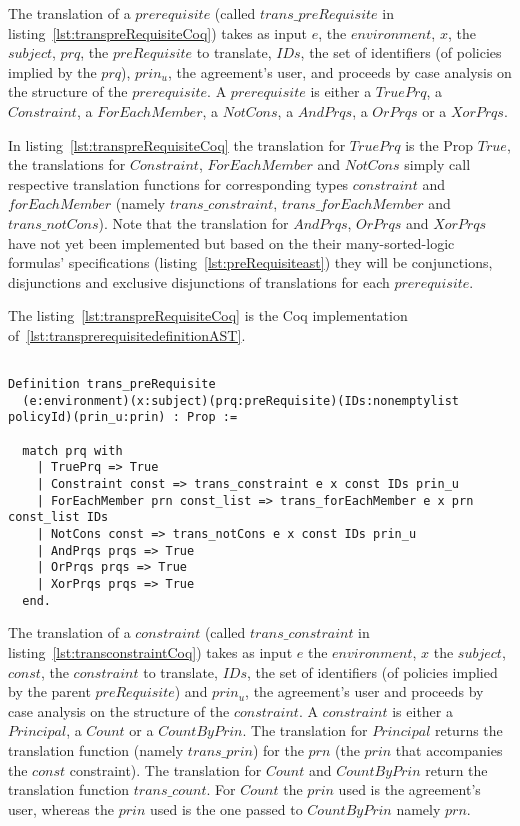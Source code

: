 The translation of a $prerequisite$ (called $trans\_preRequisite$ in listing~\ref{lst:transpreRequisiteCoq}) takes as input $e$, the $environment$, $x$, the $subject$, $prq$, the $preRequisite$ to translate, $IDs$, the set of identifiers (of policies implied by the $prq$), $prin_{u}$, the agreement's user, and proceeds by case analysis on the structure of the $prerequisite$. A $prerequisite$ is either a $TruePrq$, a $Constraint$, a $ForEachMember$, a $NotCons$, a $AndPrqs$, a $OrPrqs$ or a $XorPrqs$. 

In listing~\ref{lst:transpreRequisiteCoq} the translation for $TruePrq$ is the Prop $True$, the translations for $Constraint$, $ForEachMember$ and $NotCons$ simply call respective translation functions for corresponding types $constraint$ and $forEachMember$ (namely $trans\_constraint$, $trans\_forEachMember$ and $trans\_notCons$). Note that the translation for $AndPrqs$, $OrPrqs$ and $XorPrqs$ have not yet been implemented but based on the their many-sorted-logic formulas' specifications (listing~\ref{lst:preRequisiteast}) they will be conjunctions, disjunctions and exclusive disjunctions of translations for each $prerequisite$.

The listing~\ref{lst:transpreRequisiteCoq} is the Coq implementation of~\ref{lst:transprerequisitedefinitionAST}.


\begin{minipage}[c]{0.95\textwidth}
\begin{lstlisting}

Definition trans_preRequisite
  (e:environment)(x:subject)(prq:preRequisite)(IDs:nonemptylist policyId)(prin_u:prin) : Prop := 

  match prq with
    | TruePrq => True
    | Constraint const => trans_constraint e x const IDs prin_u 
    | ForEachMember prn const_list => trans_forEachMember e x prn const_list IDs 
    | NotCons const => trans_notCons e x const IDs prin_u 
    | AndPrqs prqs => True 
    | OrPrqs prqs => True 
    | XorPrqs prqs => True 
  end.
\end{lstlisting}
\end{minipage}

The translation of a $constraint$ (called $trans\_constraint$ in listing~\ref{lst:transconstraintCoq}) takes as input $e$ the $environment$, $x$ the $subject$, $const$, the $constraint$ to translate, $IDs$, the set of identifiers (of policies implied by the parent $preRequisite$) and $prin_{u}$, the agreement's user and proceeds by case analysis on the structure of the $constraint$. A $constraint$ is either a $Principal$, a $Count$ or a $CountByPrin$. The translation for $Principal$ returns the translation function (namely $trans\_prin$) for the $prn$ (the $prin$ that accompanies the $const$ constraint). The translation for $Count$ and $CountByPrin$ return the translation function $trans\_count$. For $Count$ the $prin$ used is the agreement's user, whereas the $prin$ used is the one passed to $CountByPrin$ namely $prn$.

